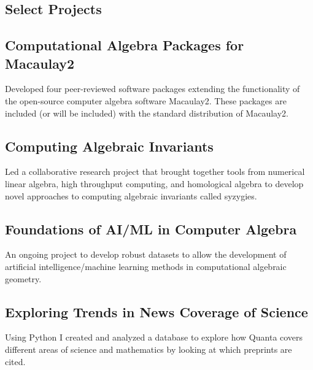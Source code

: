 \documentclass[
	10pt, %
]{FreemanCV}
\begin{document}
\begin{paracol}{2}
\section{Select Projects}

\subsection{Computational Algebra Packages for Macaulay2}

Developed four peer-reviewed software packages extending the functionality of the open-source computer algebra software Macaulay2. These packages are  included (or will be included) with the standard distribution of Macaulay2. 

\subsection{Computing Algebraic Invariants }

Led a collaborative research project that brought together tools from numerical linear algebra, high throughput computing, and homological algebra to develop novel approaches to computing algebraic invariants called syzygies. %

\subsection{Foundations of AI/ML in Computer Algebra}

An ongoing project to develop robust datasets to allow the development of artificial intelligence/machine learning methods in computational algebraic geometry.  


\subsection{Exploring Trends in News Coverage of Science}

Using Python I created and analyzed a database to explore how Quanta covers different areas of science and mathematics by looking at which preprints are cited.



\end{paracol}
\end{document}
